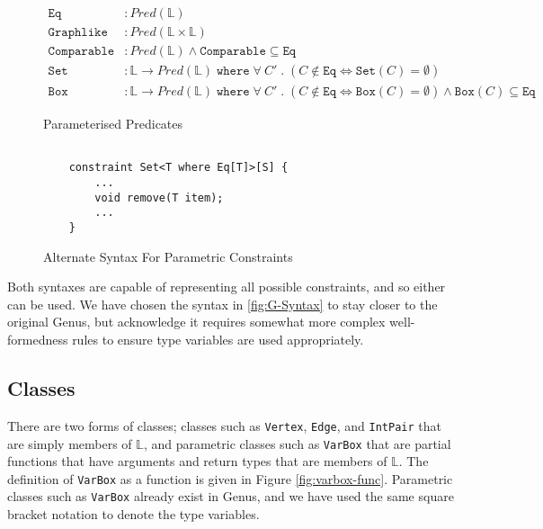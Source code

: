 \begin{figure}[H]
    \centering
    \begin{align*}
    \texttt{Eq} &: Pred(\mathbb{L}) \\
    \texttt{Graphlike} &: Pred(\mathbb{L} \times \mathbb{L}) \\
    \texttt{Comparable} &: Pred(\mathbb{L}) \land \texttt{Comparable} \subseteq \texttt{Eq} \\
    \texttt{Set} &: \mathbb{L} \to Pred(\mathbb{L}) \; \texttt{where} \; \forall \: C' \; . \; (C \notin \texttt{Eq} \iff \texttt{Set}(C) = \emptyset) \\
    \texttt{Box} &: \mathbb{L} \to Pred(\mathbb{L}) \; \texttt{where} \; \forall \: C' \; . \; (C \notin \texttt{Eq} \iff \texttt{Box}(C) = \emptyset) \land \texttt{Box}(C) \subseteq \texttt{Eq}
    \end{align*}
    \caption{Parameterised Predicates}
    \label{fig:pred-param}
\end{figure}

\begin{figure}[h]
    \centering
    \begin{verbatim}
    
    constraint Set<T where Eq[T]>[S] {
        ...
        void remove(T item);
        ...
    }
    \end{verbatim}
    \caption{Alternate Syntax For Parametric Constraints}
    \label{fig:pred-param-alt}
\end{figure}

Both syntaxes are capable of representing all possible constraints, and so either can be used. We have chosen the syntax in \ref{fig:G-Syntax} to stay closer to the original Genus, but acknowledge it requires somewhat more complex well-formedness rules to ensure type variables are used appropriately. \\

\subsection{Classes}

There are two forms of classes; classes such as \texttt{Vertex}, \texttt{Edge}, and \texttt{IntPair} that are simply members of $\mathbb{L}$, and parametric classes such as \texttt{VarBox} that are partial functions that have arguments and return types that are members of $\mathbb{L}$. The definition of \texttt{VarBox} as a function is given in Figure \ref{fig:varbox-func}. Parametric classes such as \texttt{VarBox} already exist in Genus, and we have used the same square bracket notation to denote the type variables. \\

